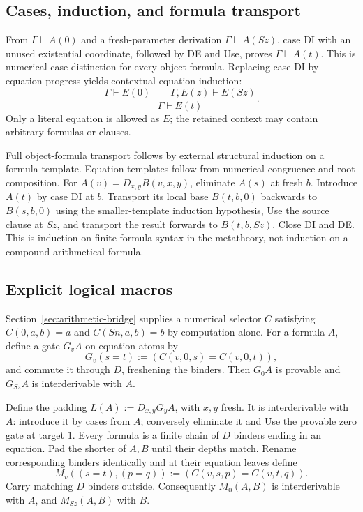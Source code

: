 \documentclass[11pt,letterpaper]{article}
\theoremstyle{definition}
\begin{document}
\subsection{Cases, induction, and formula transport}

From $\Gamma\vdash A(0)$ and a fresh-parameter derivation
$\Gamma\vdash A(Sz)$, case DI with an unused existential coordinate,
followed by DE and Use, proves $\Gamma\vdash A(t)$. This is numerical
case distinction for every object formula.
Replacing case DI by equation progress yields contextual equation induction:
\[
 \frac{\Gamma\vdash E(0)\qquad
       \Gamma,E(z)\vdash E(Sz)}
      {\Gamma\vdash E(t)}.
 \tag{Eq-ind}
\]
Only a literal equation is allowed as $E$; the retained context may
contain arbitrary formulas or clauses.

Full object-formula transport follows by external structural induction
on a formula template. Equation templates follow from numerical
congruence and root composition. For
$A(v)=D_{x,y}B(v,x,y)$, eliminate $A(s)$ at fresh $b$. Introduce
$A(t)$ by case DI at $b$. Transport its local base $B(t,b,0)$
backwards to $B(s,b,0)$ using the smaller-template induction hypothesis,
Use the source clause at $Sz$, and transport the result forwards to
$B(t,b,Sz)$. Close DI and DE. This is induction on finite formula
syntax in the metatheory, not induction on a compound arithmetical formula.

\subsection{Explicit logical macros}

Section~\ref{sec:arithmetic-bridge} supplies a numerical selector
$C$ satisfying $C(0,a,b)=a$ and $C(Sn,a,b)=b$ by computation alone.
For a formula $A$, define a gate $G_v A$ on equation atoms by
\[
             G_v(s=t):=(C(v,0,s)=C(v,0,t)),
\]
and commute it through $D$, freshening the binders. Then $G_0A$ is
provable and $G_{Sz}A$ is interderivable with $A$.

Define the padding $L(A):=D_{x,y}G_yA$, with $x,y$ fresh. It is
interderivable with $A$: introduce it by cases from $A$; conversely
eliminate it and Use the provable zero gate at target $1$.
Every formula is a finite chain of $D$ binders ending in an equation.
Pad the shorter of $A,B$ until their depths match. Rename corresponding
binders identically and at their equation leaves define
\[
 M_v((s=t),(p=q)):=
       (C(v,s,p)=C(v,t,q)).
\]
Carry matching $D$ binders outside. Consequently
$M_0(A,B)$ is interderivable with $A$, and $M_{Sz}(A,B)$ with $B$.
\end{document}
